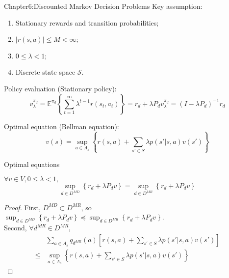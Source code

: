 \documentclass{beamer}
\begin{document}
\begin{frame}[t]{Chapter6:Discounted Markov Decision Problems}
    Key assumption:
    \begin{enumerate}
        \item Stationary rewards and transition probabilities;
        \item $ \left| r(s,a) \right| \le M < \infty $;
        \item $ 0 \le \lambda < 1 $;
        \item Discrete state space $ \mathcal{S} $.
    \end{enumerate}

    Policy evaluation (Stationary policy):
    \[
        v^{\pi_d}_\lambda = \mathbb{E}^{\pi_d}\left\{ \sum^{\infty}_{t=1} \lambda^{t-1}r(s_t, a_t) \right\} = r_{d} + \lambda P_{d} v^{\pi_d}_{\lambda} = {(I-\lambda P_d)}^{-1} r_d
    \]

    Optimal equation (Bellman equation):
    \[
        v(s) = \sup_{a \in A_s} \left\{ r(s, a) + \sum^{}_{s' \in S} \lambda p(s' | s, a) v(s') \right\}
    \]
\end{frame}

\begin{frame}[shrink]{Optimal equations}
    \begin{theorem}
        $ \forall v \in V, 0 \le \lambda < 1, $
        \[
            \sup_{d \in D^{MD}} \left\{ r_d + \lambda P_d v \right\} = \sup_{d \in D^{MR}} \left\{ r_d + \lambda P_d v \right\} 
        \]
        \begin{proof}
            First, $ D^{MD} \subset D^{MR} $, so $ \sup_{d \in D^{MD}} \left\{ r_d + \lambda P_d v \right\}\preceq \sup_{d \in D^{MR}} \left\{ r_d + \lambda P_d v \right\} $. \\
            Second, $ \forall d^{MR} \in D^{MR} $, 
            \begin{align*}
                &\sum^{}_{a \in A_s} q_{d^{MR}}(a) \left[ r(s, a) + \sum^{}_{s' \in S} \lambda p(s' | s, a) v(s') \right]\\
                \le& \sup_{a \in A_s} \left\{ r(s, a) + \sum^{}_{s' \in S} \lambda p(s'|s, a) v(s') \right\}
            \end{align*}
        \end{proof}
    \end{theorem}
\end{frame}
\end{document}
